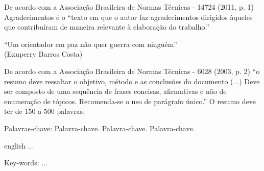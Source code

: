 \documentclass[
        12pt,
        openany, %
        oneside, %
        a4paper,			
        english,			
        brazil			        %
        ]{abntbibufjf}
\begin{document}
\begin{agradecimentos}

De acordo com a Associa\c{c}\~ao Brasileira de Normas T\'ecnicas - 14724 (2011, p. 1) Agradecimentos 
\'e o ``texto em que o autor faz agradecimentos dirigidos \`aqueles que contribu\'iram de maneira relevante \`a elabora\c{c}\~ao do trabalho.'' 
  



\end{agradecimentos}

\begin{epigrafe}
    \vspace*{\fill}
	\begin{flushright}
		``Um orientador em paz não quer guerra com ninguém''\\
		(Exuperry Barros Costa)
	\end{flushright}
\end{epigrafe}



\setlength{\absparsep}{18pt} 
\begin{resumo}

De acordo com a Associa\c{c}\~ao Brasileira de Normas T\'ecnicas - 6028 (2003, p. 2) ``o resumo deve ressaltar 
o objetivo, m\'etodo e as conclus\~oes do documento (...) Deve ser composto de uma sequ\^encia de frases 
concisas, afirmativas e n\~ao de enumera\c{c}\~ao de t\'opicos. Recomenda-se o uso de par\'agrafo \'unico.''
O resumo deve ter de 150 a 500 palavras.

Palavras-chave: Palavra-chave. Palavra-chave. Palavra-chave.

\end{resumo}
 
 
\begin{resumo}[ABSTRACT]
  \begin{otherlanguage*}{english}
   ...

Key-words: ...
 \end{otherlanguage*}
\end{resumo}


\listoffigures*
\cleardoublepage
\end{document}

